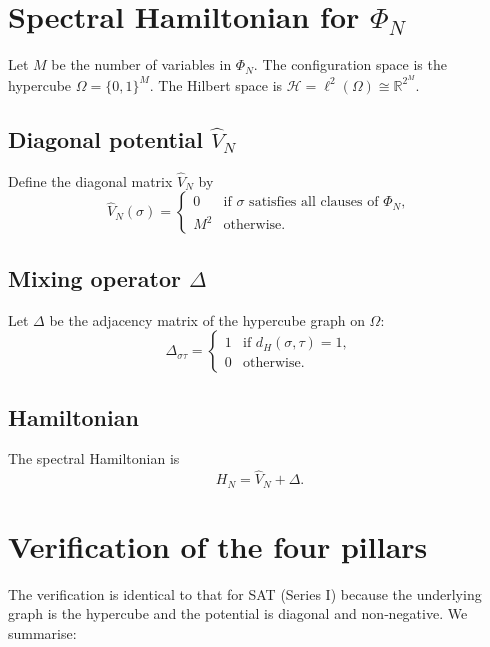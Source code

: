 \documentclass[11pt,a4paper]{article}
\begin{document}
\section{Spectral Hamiltonian for \(\Phi_N\)}

Let \(M\) be the number of variables in \(\Phi_N\). The configuration space is the hypercube \(\Omega = \{0,1\}^M\). The Hilbert space is \(\mathcal{H} = \ell^2(\Omega) \cong \mathbb{R}^{2^M}\).

\subsection{Diagonal potential \(\hat{V}_N\)}
Define the diagonal matrix \(\hat{V}_N\) by
\[
\hat{V}_N(\sigma) = \begin{cases}
0 & \text{if }\sigma\text{ satisfies all clauses of } \Phi_N,\\
M^2 & \text{otherwise}.
\end{cases}
\]

\subsection{Mixing operator \(\Delta\)}
Let \(\Delta\) be the adjacency matrix of the hypercube graph on \(\Omega\):
\[
\Delta_{\sigma\tau} = \begin{cases}
1 & \text{if } d_H(\sigma,\tau)=1,\\
0 & \text{otherwise}.
\end{cases}
\]

\subsection{Hamiltonian}
The spectral Hamiltonian is
\[
H_N = \hat{V}_N + \Delta.
\]

\section{Verification of the four pillars}

The verification is identical to that for SAT (Series I) because the underlying graph is the hypercube and the potential is diagonal and non‑negative. We summarise:
\end{document}
